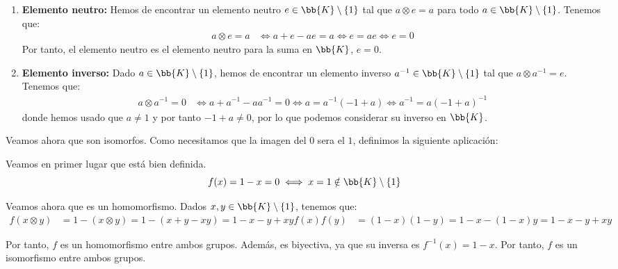 \begin{ejercicio}
\begin{enumerate}
        \item \textbf{Elemento neutro:} Hemos de encontrar un elemento neutro $e\in \bb{K}\setminus \{1\}$ tal que $a\otimes e=a$ para todo $a\in \bb{K}\setminus \{1\}$. Tenemos que:
        \begin{align*}
            a\otimes e = a &\iff a+e-ae=a\iff e=ae\iff e=0
        \end{align*}
        Por tanto, el elemento neutro es el elemento neutro para la suma en $\bb{K}$, $e=0$.

        \item \textbf{Elemento inverso:} Dado $a\in \bb{K}\setminus \{1\}$, hemos de encontrar un elemento inverso $a^{-1}\in \bb{K}\setminus \{1\}$ tal que $a\otimes a^{-1}=e$. Tenemos que:
        \begin{align*}
            a\otimes a^{-1} = 0 &\iff a+a^{-1}-aa^{-1}=0\iff a=a^{-1}(-1+a)\iff a^{-1}=a(-1+a)^{-1}
        \end{align*}
        donde hemos usado que $a\neq 1$ y por tanto $-1+a\neq 0$, por lo que podemos considerar su inverso en $\bb{K}$.
    \end{enumerate}

    Veamos ahora que son isomorfos. Como necesitamos que la imagen del $0$ sera el $1$,
    definimos la siguiente aplicación:

    Veamos en primer lugar que está bien definida.
    \begin{equation*}
        f(x)=1-x=0\iff x=1\notin \bb{K}\setminus \{1\}
    \end{equation*}

    Veamos ahora que es un homomorfismo. Dados $x,y\in \bb{K}\setminus \{1\}$, tenemos que:
    \begin{align*}
        f(x\otimes y) &= 1-(x\otimes y) = 1-(x+y-xy) = 1-x-y+xy
        f(x)f(y) &= (1-x)(1-y) = 1-x-(1-x)y=1-x-y+xy
    \end{align*}

    Por tanto, $f$ es un homomorfismo entre ambos grupos. Además, es biyectiva, ya que su inversa es $f^{-1}(x)=1-x$. Por tanto, $f$ es un isomorfismo entre ambos grupos.
\end{ejercicio}

